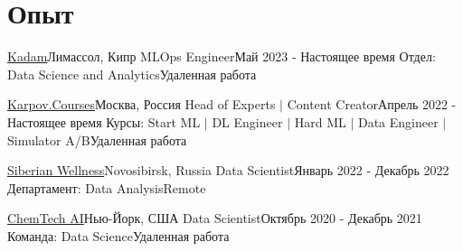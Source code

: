 \section{Опыт}
  \resumeSubHeadingListStart

    \resumeSubheadingWork
      {\href{https://www.kadam.net/}{Kadam}}{Лимассол, Кипр}
      {MLOps Engineer}{Май 2023 - Настоящее время}
      {Отдел: Data Science and Analytics}{Удаленная работа}
    \resumeItemListStart
    \resumeItemListEnd

    \resumeSubheadingWork
      {\href{https://www.karpov.courses/}{Karpov.Courses}}{Москва, Россия}
      {Head of Experts $|$ Content Creator}{Апрель 2022 - Настоящее время}
      {Курсы: Start ML $|$ DL Engineer $|$ Hard ML $|$ Data Engineer $|$ Simulator A/B}{Удаленная работа}
    \resumeItemListStart
    \resumeItemListEnd

    \resumeSubheadingWork
      {\href{https://siberianhealth.com/en}{Siberian Wellness}}{Novosibirsk, Russia}
      {Data Scientist}{Январь 2022 - Декабрь 2022}
      {Департамент: Data Analysis}{Remote}
    \resumeItemListStart
    \resumeItemListEnd

    \resumeSubheadingWork
      {\href{https://www.chmtch.com/}{ChemTech AI}}{Нью-Йорк, США}
      {Data Scientist}{Октябрь 2020 - Декабрь 2021}
      {Команда: Data Science}{Удаленная работа}
    \resumeItemListStart
    \resumeItemListEnd

  \resumeSubHeadingListEnd
